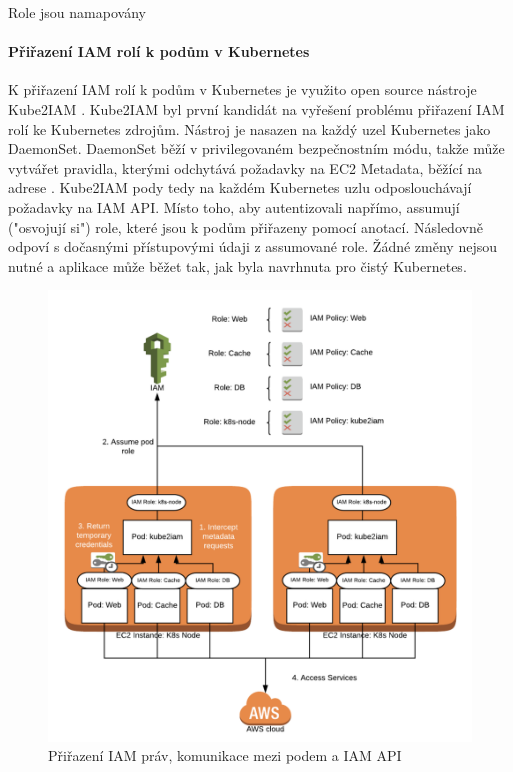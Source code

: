 \documentclass[thesis=M,czech]{FITthesis}[2019/12/23]
\theoremstyle{plain}
\theoremstyle{definition}
\begin{document}
Role jsou namapovány 

\paragraph{Přiřazení IAM rolí k podům v Kubernetes}

K přiřazení IAM rolí k podům v Kubernetes je využito open source nástroje Kube2IAM \cite{kube2iam-github}.  Kube2IAM byl první kandidát na vyřešení problému přiřazení IAM rolí ke Kubernetes zdrojům. Nástroj je nasazen na každý uzel Kubernetes jako DaemonSet. 
DaemonSet běží v privilegovaném bezpečnostním módu, takže může vytvářet  pravidla, kterými odchytává požadavky na EC2 Metadata, běžící na adrese . Kube2IAM pody tedy na každém Kubernetes uzlu odposlouchávají požadavky na IAM API. Místo toho, aby  autentizovali napřímo, assumují ("osvojují si") role, které jsou k podům přiřazeny pomocí anotací. Následovně odpoví s dočasnými přístupovými údaji z assumované role. Žádné změny nejsou nutné a aplikace může běžet tak, jak byla navrhnuta pro čistý Kubernetes.

\begin{figure}[H]\centering
	\includegraphics[width=1\textwidth]{graphs/kube2iam.png}

	\caption[Přiřazení IAM práv, komunikace mezi podem a IAM API]{Přiřazení IAM práv, komunikace mezi podem a IAM API}\label{fig:float}
\end{figure}
\end{document}
